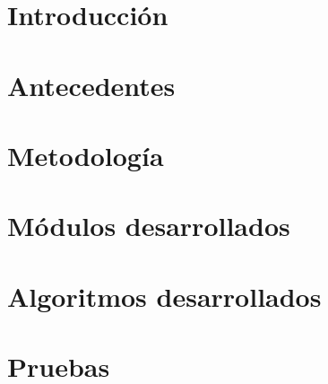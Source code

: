 \documentclass[10pt]{book}
\begin{document}

\thispagestyle{empty}

\frontmatter
\tableofcontents
\listoffigures
\mainmatter

 \hideControlVersion

\chapter{Introducción}\label{chp:introduccion}
\hypertarget{chp:introduccion}{}

\chapter{Antecedentes}\label{chp:introduccion}
\hypertarget{chp:antecedentes}{}

\chapter{Metodología}\label{chp:metodologia} 
\hypertarget{chp:metodologia}{}

\chapter{Módulos desarrollados}\label{chp:modulosDesarrollados} 
\hypertarget{chp:modulosDesarrollados}{}

\chapter{Algoritmos desarrollados}\label{chp:algoritmosDesarrollados} 
\hypertarget{chp:algoritmosDesarrollados}{}

\chapter{Pruebas}\label{chp:pruebas} 
\hypertarget{chp:pruebas}{}
\end{document}
